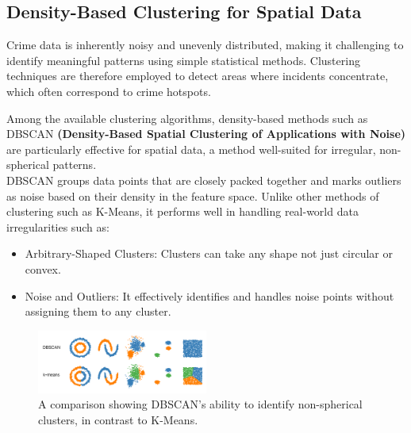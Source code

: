 \documentclass[12pt,a4paper,oneside,english]{book}
\begin{document}
{\subsection{Density-Based Clustering for Spatial Data}%
\label{sec:dbscan_theory}
Crime data is inherently noisy and unevenly distributed, making it challenging to identify meaningful patterns using simple statistical methods. Clustering techniques are therefore employed to detect areas 
where incidents concentrate, which often correspond to crime hotspots.

Among the available clustering algorithms, density-based methods such as DBSCAN \textbf{(Density-Based Spatial Clustering of Applications with Noise) } \cite{BIRANT2007208dbscan} are particularly effective for spatial data, a method well-suited for irregular,
 non-spherical patterns.
 \\
DBSCAN groups data points that are closely packed together and marks outliers as noise based on their density in the feature space.
Unlike other methods of clustering such as K-Means, it performs well in handling real-world data irregularities such as:
\begin{itemize}
    \item Arbitrary-Shaped Clusters: Clusters can take any shape not just circular or convex.
    \item Noise and Outliers: It effectively identifies and handles noise points without assigning them to any cluster.
\end{itemize}

\begin{figure}[h!] %
    \centering
    \includegraphics[width=0.5\textwidth]{images/dbscanVSkmeans.png}
    \captionsetup{width=0.6\textwidth}
    \caption{A comparison showing DBSCAN's ability to identify non-spherical clusters, in contrast to K-Means.}
    \label{fig:dbscan_vs_kmeans}
\end{figure}

}
\end{document}
